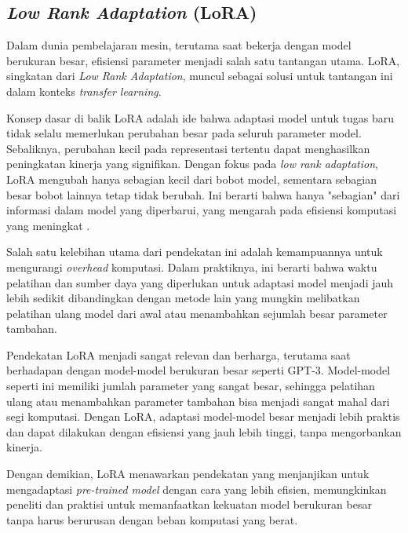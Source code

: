 \subsection{\textit{Low Rank Adaptation} (LoRA)}

Dalam dunia pembelajaran mesin, terutama saat bekerja dengan model berukuran besar, efisiensi parameter menjadi salah satu tantangan utama. LoRA, singkatan dari \textit{Low Rank Adaptation}, muncul sebagai solusi untuk tantangan ini dalam konteks \textit{transfer learning}.

Konsep dasar di balik LoRA adalah ide bahwa adaptasi model untuk tugas baru tidak selalu memerlukan perubahan besar pada seluruh parameter model. Sebaliknya, perubahan kecil pada representasi tertentu dapat menghasilkan peningkatan kinerja yang signifikan. Dengan fokus pada \textit{low rank adaptation}, LoRA mengubah hanya sebagian kecil dari bobot model, sementara sebagian besar bobot lainnya tetap tidak berubah. Ini berarti bahwa hanya "sebagian" dari informasi dalam model yang diperbarui, yang mengarah pada efisiensi komputasi yang meningkat \parencite{lora}.

Salah satu kelebihan utama dari pendekatan ini adalah kemampuannya untuk mengurangi \textit{overhead} komputasi. Dalam praktiknya, ini berarti bahwa waktu pelatihan dan sumber daya yang diperlukan untuk adaptasi model menjadi jauh lebih sedikit dibandingkan dengan metode lain yang mungkin melibatkan pelatihan ulang model dari awal atau menambahkan sejumlah besar parameter tambahan.

Pendekatan LoRA menjadi sangat relevan dan berharga, terutama saat berhadapan dengan model-model berukuran besar seperti GPT-3. Model-model seperti ini memiliki jumlah parameter yang sangat besar, sehingga pelatihan ulang atau menambahkan parameter tambahan bisa menjadi sangat mahal dari segi komputasi. Dengan LoRA, adaptasi model-model besar menjadi lebih praktis dan dapat dilakukan dengan efisiensi yang jauh lebih tinggi, tanpa mengorbankan kinerja.

Dengan demikian, LoRA menawarkan pendekatan yang menjanjikan untuk mengadaptasi \textit{pre-trained model} dengan cara yang lebih efisien, memungkinkan peneliti dan praktisi untuk memanfaatkan kekuatan model berukuran besar tanpa harus berurusan dengan beban komputasi yang berat.